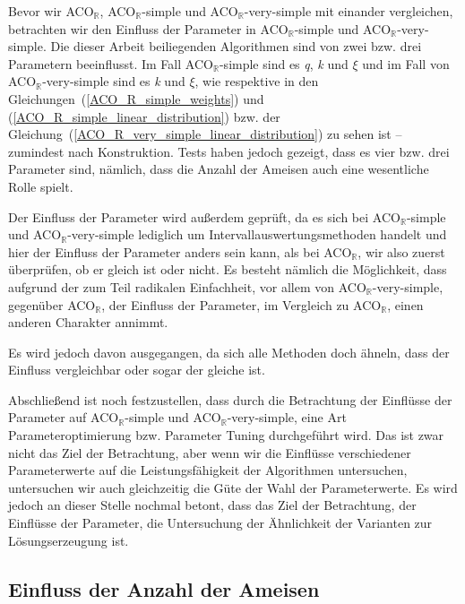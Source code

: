 \documentclass[fontsize=12, a4aper]{scrartcl}
\begin{document}
	Bevor wir ACO\(_{\mathbb{R}}\), ACO\(_{\mathbb{R}}\)-simple und ACO\(_{\mathbb{R}}\)-very-simple mit einander vergleichen, betrachten wir den Einfluss der Parameter in ACO\(_{\mathbb{R}}\)-simple und ACO\(_{\mathbb{R}}\)-very-simple. Die dieser Arbeit beiliegenden Algorithmen sind von zwei bzw. drei Parametern beeinflusst. Im Fall  ACO\(_{\mathbb{R}}\)-simple sind es \textit{q}, \textit{k} und \(\xi\) und im Fall von ACO\(_{\mathbb{R}}\)-very-simple sind es \textit{k} und \(\xi\), wie respektive in den Gleichungen~(\ref{ACO_R_simple_weights}) und (\ref{ACO_R_simple_linear_distribution}) bzw. der Gleichung~(\ref{ACO_R_very_simple_linear_distribution}) zu sehen ist --  zumindest nach Konstruktion. Tests haben jedoch gezeigt, dass es vier bzw. drei Parameter sind, nämlich, dass die Anzahl der Ameisen auch eine wesentliche Rolle spielt.\hfill\newline
	
	Der Einfluss der Parameter wird außerdem geprüft, da es sich bei ACO\(_{\mathbb{R}}\)-simple und ACO\(_{\mathbb{R}}\)-very-simple lediglich um Intervallauswertungsmethoden handelt und hier der Einfluss der Parameter anders sein kann, als bei ACO\(_{\mathbb{R}}\), wir also zuerst überprüfen, ob er gleich ist oder nicht. Es besteht nämlich die Möglichkeit, dass aufgrund der zum Teil radikalen Einfachheit, vor allem von ACO\(_{\mathbb{R}}\)-very-simple, gegenüber ACO\(_{\mathbb{R}}\), der Einfluss der Parameter, im Vergleich zu ACO\(_{\mathbb{R}}\), einen anderen Charakter annimmt.\hfill\newline
	
	Es wird jedoch davon ausgegangen, da sich alle Methoden doch ähneln, dass der Einfluss vergleichbar oder sogar der gleiche ist.\hfill\newline
	
	Abschließend ist noch festzustellen, dass durch die Betrachtung der Einflüsse der Parameter auf ACO\(_{\mathbb{R}}\)-simple und ACO\(_{\mathbb{R}}\)-very-simple, eine Art Parameteroptimierung bzw. Parameter Tuning durchgeführt wird. Das ist zwar nicht das Ziel der Betrachtung, aber wenn wir die Einflüsse verschiedener Parameterwerte auf die Leistungsfähigkeit der Algorithmen untersuchen, untersuchen wir auch gleichzeitig die Güte der Wahl der Parameterwerte. Es wird jedoch an dieser Stelle nochmal betont, dass das Ziel der Betrachtung, der Einflüsse der Parameter, die Untersuchung der Ähnlichkeit der Varianten zur Lösungserzeugung ist.
	
	\subsection{Einfluss der Anzahl der Ameisen}
	
\end{document}
